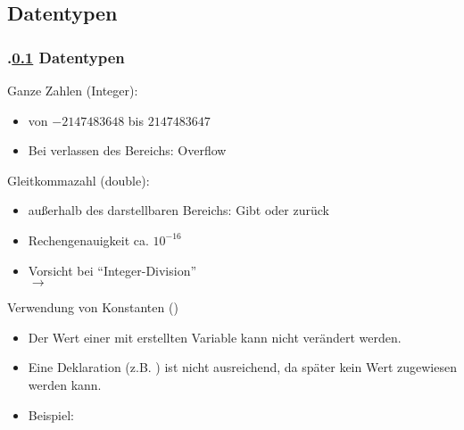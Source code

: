 \def\stitle{Datentypen}%
\subsection{\stitle}\label{S:type}
\begin{frame}[t]%
  \frametitle{\kap.\ref{S:type} \stitle }%
\medskip
Ganze Zahlen (Integer): \\
\begin{itemize}
  \item von $-2147483648$ bis $2147483647$
  \item Bei verlassen des Bereichs: Overflow
\end{itemize}
\medskip
Gleitkommazahl (double): \\
\begin{itemize}
 \item außerhalb des darstellbaren Bereichs: Gibt  oder  zur\"uck
 \item Rechengenauigkeit ca. $10^{-16}$
 \item Vorsicht bei "`Integer-Division"'\\
  $\rightarrow$ 
\end{itemize}
\medskip
Verwendung von Konstanten ()
\begin{itemize}
  \item Der Wert einer mit  erstellten Variable kann nicht ver\"andert werden.
  \item Eine Deklaration (z.B. ) ist nicht ausreichend, da sp\"ater kein Wert zugewiesen werden kann.
  \item Beispiel: 
\end{itemize}
\end{frame}
